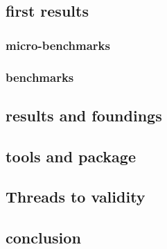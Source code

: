 \subsection{first results}

\subsubsection{micro-benchmarks}

\subsubsection{benchmarks}

\subsection{results and foundings}

\subsection{tools and package}

\subsection{Threads to validity}

\subsection{conclusion}

